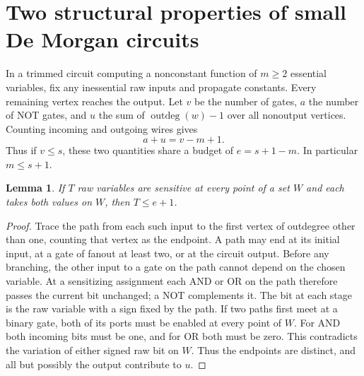 \documentclass[11pt]{article}
\newtheorem{lemma}[theorem]{Lemma}
\begin{document}
\section{Two structural properties of small De Morgan circuits}
In a trimmed circuit computing a nonconstant function of $m\ge2$ essential variables, fix any inessential raw inputs and propagate constants. Every remaining vertex reaches the output. Let $v$ be the number of gates, $a$ the number of NOT gates, and $u$ the sum of $\operatorname{outdeg}(w)-1$ over all nonoutput vertices. Counting incoming and outgoing wires gives
\[
                 a+u=v-m+1.
\]
Thus if $v\le s$, these two quantities share a budget of $e=s+1-m$. In particular $m\le s+1$.

\begin{lemma}\label{lem:paths}
If $T$ raw variables are sensitive at every point of a set $W$ and each takes both values on $W$, then $T\le e+1$.
\end{lemma}
\begin{proof}
Trace the path from each such input to the first vertex of outdegree other than one, counting that vertex as the endpoint. A path may end at its initial input, at a gate of fanout at least two, or at the circuit output. Before any branching, the other input to a gate on the path cannot depend on the chosen variable. At a sensitizing assignment each AND or OR on the path therefore passes the current bit unchanged; a NOT complements it. The bit at each stage is the raw variable with a sign fixed by the path. If two paths first meet at a binary gate, both of its ports must be enabled at every point of $W$. For AND both incoming bits must be one, and for OR both must be zero. This contradicts the variation of either signed raw bit on $W$. Thus the endpoints are distinct, and all but possibly the output contribute to $u$.
\end{proof}
\end{document}
